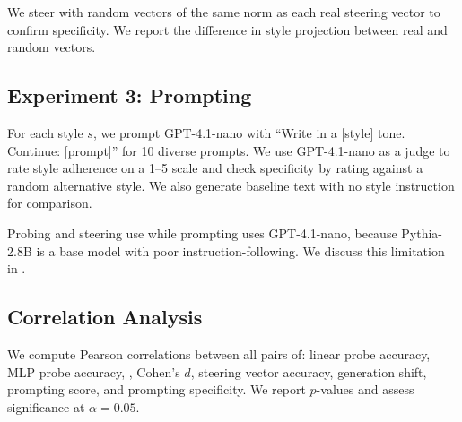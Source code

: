  We steer with random vectors of the same norm as each real steering vector to confirm specificity. We report the difference in style projection between real and random vectors.

\subsection{Experiment 3: Prompting}
\label{sec:prompting}

For each style $s$, we prompt GPT-4.1-nano with ``Write in a [style] tone. Continue: [prompt]'' for 10 diverse prompts. We use GPT-4.1-nano as a judge to rate style adherence on a 1--5 scale and check specificity by rating against a random alternative style. We also generate baseline text with no style instruction for comparison.

 Probing and steering use \pythia while prompting uses GPT-4.1-nano, because Pythia-2.8B is a base model with poor instruction-following. We discuss this limitation in .

\subsection{Correlation Analysis}

We compute Pearson correlations between all pairs of: linear probe accuracy, MLP probe accuracy, \nlindex, Cohen's $d$, steering vector accuracy, generation shift, prompting score, and prompting specificity. We report $p$-values and assess significance at $\alpha = 0.05$.
